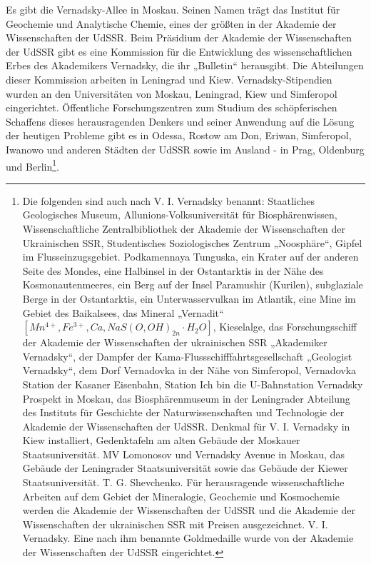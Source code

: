 \documentclass[11pt,a4paper]{article}
\begin{document}
Es gibt die Vernadsky-Allee in Moskau. Seinen Namen trägt das Institut für
Geochemie und Analytische Chemie, eines der größten in der Akademie der
Wissenschaften der UdSSR. Beim Präsidium der Akademie der Wissenschaften der
UdSSR gibt es eine Kommission für die Entwicklung des wissenschaftlichen Erbes
des Akademikers Vernadsky, die ihr „Bulletin“ herausgibt. Die Abteilungen
dieser Kommission arbeiten in Leningrad und Kiew. Vernadsky-Stipendien wurden
an den Universitäten von Moskau, Leningrad, Kiew und Simferopol eingerichtet.
Öffentliche Forschungszentren zum Studium des schöpferischen Schaffens dieses
herausragenden Denkers und seiner Anwendung auf die Lösung der heutigen
Probleme gibt es in Odessa, Rostow am Don, Eriwan, Simferopol, Iwanowo und
anderen Städten der UdSSR sowie im Ausland - in Prag, Oldenburg und
Berlin\footnote{Die folgenden sind auch nach V. I. Vernadsky benannt:
  Staatliches Geologisches Museum, Allunions-Volksuniversität für
  Biosphärenwissen, Wissenschaftliche Zentralbibliothek der Akademie der
  Wissenschaften der Ukrainischen SSR, Studentisches Soziologisches Zentrum
  „Noosphäre“, Gipfel im Flusseinzugsgebiet. Podkamennaya Tunguska, ein Krater
  auf der anderen Seite des Mondes, eine Halbinsel in der Ostantarktis in der
  Nähe des Kosmonautenmeeres, ein Berg auf der Insel Paramushir (Kurilen),
  subglaziale Berge in der Ostantarktis, ein Unterwasservulkan im Atlantik,
  eine Mine im Gebiet des Baikalsees, das Mineral „Vernadit“ $[Mn^{4+},
    Fe^{3+}, Ca, NaS( O, OH)_{2n}\cdot H_2O]$, Kieselalge, das
  Forschungsschiff der Akademie der Wissenschaften der ukrainischen SSR
  „Akademiker Vernadsky“, der Dampfer der Kama-Flussschifffahrtsgesellschaft
  „Geologist Vernadsky“, dem Dorf Vernadovka in der Nähe von Simferopol,
  Vernadovka Station der Kasaner Eisenbahn, Station Ich bin die U-Bahnstation
  Vernadsky Prospekt in Moskau, das Biosphärenmuseum in der Leningrader
  Abteilung des Instituts für Geschichte der Naturwissenschaften und
  Technologie der Akademie der Wissenschaften der UdSSR. Denkmal für
  V. I. Vernadsky in Kiew installiert, Gedenktafeln am alten Gebäude der
  Moskauer Staatsuniversität. MV Lomonosov und Vernadsky Avenue in Moskau, das
  Gebäude der Leningrader Staatsuniversität sowie das Gebäude der Kiewer
  Staatsuniversität. T. G. Shevchenko. Für herausragende wissenschaftliche
  Arbeiten auf dem Gebiet der Mineralogie, Geochemie und Kosmochemie werden
  die Akademie der Wissenschaften der UdSSR und die Akademie der
  Wissenschaften der ukrainischen SSR mit Preisen ausgezeichnet.
  V. I. Vernadsky.  Eine nach ihm benannte Goldmedaille wurde von der Akademie
  der Wissenschaften der UdSSR eingerichtet.  }.
\end{document}
